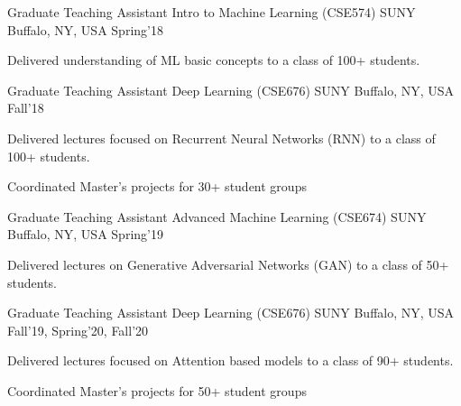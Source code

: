 


\begin{cventries}


\cventry
{Graduate Teaching Assistant} %
{Intro to Machine Learning (CSE574)} %
{SUNY Buffalo, NY, USA} %
{Spring'18} %
{ %
\begin{cvitems}
\item {Delivered understanding of ML basic concepts to a class of 100+ students.}
\end{cvitems}
}


\cventry
{Graduate Teaching Assistant} %
{Deep Learning (CSE676)} %
{SUNY Buffalo, NY, USA} %
{Fall'18} %
{ %
\begin{cvitems}
\item {Delivered lectures focused on Recurrent Neural Networks (RNN) to a class of 100+ students.}
\item {Coordinated Master's projects for 30+ student groups}
\end{cvitems}
}


\cventry
{Graduate Teaching Assistant} %
{Advanced Machine Learning (CSE674)} %
{SUNY Buffalo, NY, USA} %
{Spring'19} %
{ %
\begin{cvitems}
\item {Delivered lectures on Generative Adversarial Networks (GAN) to a class of 50+ students.}
\end{cvitems}
}


\cventry
{Graduate Teaching Assistant} %
{Deep Learning (CSE676)} %
{SUNY Buffalo, NY, USA} %
{Fall'19, Spring'20, Fall'20} %
{ %
\begin{cvitems}
\item {Delivered lectures focused on Attention based models to a class of 90+ students.}
\item {Coordinated Master's projects for 50+ student groups}
\end{cvitems}
}


\end{cventries}